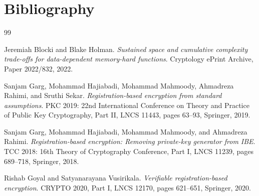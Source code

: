 \documentclass{aicr-conjecture}
\begin{document}
\section{Bibliography}

\begin{aicrbibliography}{99}

Jeremiah Blocki and Blake Holman.
\emph{Sustained space and cumulative complexity trade-offs for
data-dependent memory-hard functions}.
Cryptology ePrint Archive, Paper 2022/832, 2022.

Sanjam Garg, Mohammad Hajiabadi, Mohammad Mahmoody, Ahmadreza Rahimi,
and Sruthi Sekar.
\emph{Registration-based encryption from standard assumptions}.
PKC 2019: 22nd International Conference on Theory and Practice of Public
Key Cryptography, Part II, LNCS 11443, pages 63--93, Springer, 2019.

Sanjam Garg, Mohammad Hajiabadi, Mohammad Mahmoody, and Ahmadreza
Rahimi.
\emph{Registration-based encryption: Removing private-key generator from
IBE}.
TCC 2018: 16th Theory of Cryptography Conference, Part I, LNCS 11239,
pages 689--718, Springer, 2018.

Rishab Goyal and Satyanarayana Vusirikala.
\emph{Verifiable registration-based encryption}.
CRYPTO 2020, Part I, LNCS 12170, pages 621--651, Springer, 2020.

\end{aicrbibliography}
\end{document}

